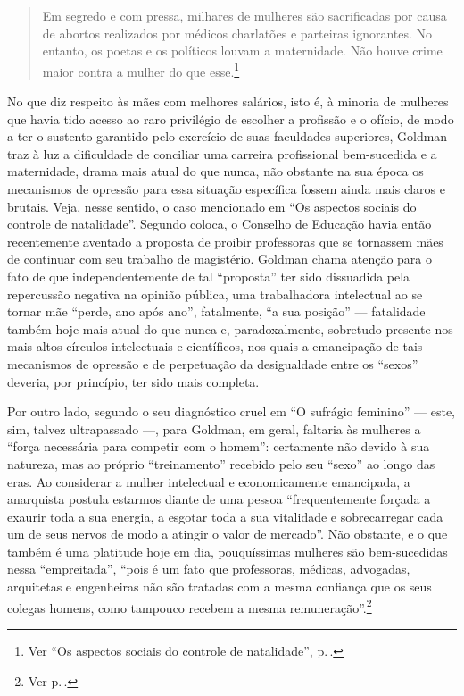 \begin{quote}
Em segredo e com pressa, milhares de
mulheres são sacrificadas por causa de abortos realizados por médicos
charlatões e parteiras ignorantes. No entanto, os poetas e os políticos
louvam a maternidade. Não houve crime maior contra a mulher do que esse.\footnote{Ver ``Os aspectos sociais do controle de natalidade'', p.\,\pageref{aborto}.}
\end{quote}

No que diz respeito às mães com melhores salários, isto é, à minoria de
mulheres que havia tido acesso ao raro privilégio de escolher a
profissão e o ofício, de modo a ter o sustento garantido pelo exercício
de suas faculdades superiores, Goldman traz à luz a dificuldade de
conciliar uma carreira profissional bem-sucedida e a maternidade, drama
mais atual do que nunca, não obstante na sua época os mecanismos de
opressão para essa situação específica fossem ainda mais claros e
brutais. Veja, nesse sentido, o caso mencionado em ``Os aspectos
sociais do controle de natalidade''. Segundo coloca, o Conselho de
Educação havia então recentemente aventado a proposta de proibir
professoras que se tornassem mães de continuar com seu trabalho de
magistério. Goldman chama atenção para o fato de que independentemente
de tal ``proposta'' ter sido dissuadida pela repercussão negativa na
opinião pública, uma trabalhadora intelectual ao se tornar mãe ``perde,
ano após ano'', fatalmente, ``a sua posição'' --- fatalidade também hoje
mais atual do que nunca e, paradoxalmente, sobretudo presente nos mais
altos círculos intelectuais e científicos, nos quais a emancipação de
tais mecanismos de opressão e de perpetuação da desigualdade entre os
``sexos'' deveria, por princípio, ter sido mais completa.

Por outro lado, segundo o seu diagnóstico cruel em ``O sufrágio
feminino'' --- este, sim, talvez ultrapassado ---, para Goldman, em geral,
faltaria às mulheres a ``força necessária para competir com o homem'':
certamente não devido à sua natureza, mas ao próprio ``treinamento''
recebido pelo seu ``sexo'' ao longo das eras. Ao considerar a mulher
intelectual e economicamente emancipada, a anarquista postula estarmos
diante de uma pessoa ``frequentemente forçada a exaurir toda a sua
energia, a esgotar toda a sua vitalidade e sobrecarregar cada um de seus
nervos de modo a atingir o valor de mercado''. Não obstante, e o que
também é uma platitude hoje em dia, pouquíssimas mulheres são
bem-sucedidas nessa ``empreitada'', ``pois é um fato que
professoras, médicas, advogadas, arquitetas e engenheiras não são
tratadas com a mesma confiança que os seus colegas homens, como tampouco
recebem a mesma remuneração''.\footnote{Ver p.\,\pageref{igualdade}.}

